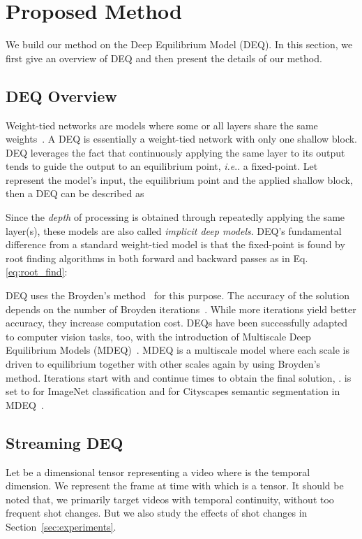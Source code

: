 \documentclass[runningheads]{llncs}
\makeatletter
\DeclareRobustCommand\onedot{\futurelet\@let@token\@onedot}
\def\@onedot{\ifx\@let@token.\else.\null\fi\xspace}
\def\ie{\emph{i.e}\onedot} \def\Ie{\emph{I.e}\onedot}
\makeatother
\begin{document}
\section{Proposed Method}\label{sec:method}


We build our method on the Deep Equilibrium Model (DEQ). In this section, we first give an overview of DEQ and then present the details of our method. 


\subsection{DEQ Overview}


Weight-tied networks are models where some or all layers share the same weights~\cite{bai2018trellis,dehghani2018universal}. A DEQ is essentially a weight-tied network with only one shallow block. DEQ leverages the fact that continuously applying the same layer to its output tends to guide the output to an equilibrium point, \ie a fixed-point. Let  represent the model’s input,  the equilibrium point and  the applied shallow block, then a DEQ can be described as

Since the {\em depth} of processing is obtained through repeatedly applying the same layer(s), these models are also called {\em implicit deep models}. DEQ’s fundamental difference from a standard weight-tied model is that the fixed-point is found by root finding algorithms in both forward and backward passes as in Eq. \ref{eq:root_find}: 

DEQ uses the Broyden's method~\cite{broyden1965class} for this purpose.  The accuracy of the solution depends on the number of Broyden iterations~\cite{bai2021neural,bai2021stabilizing}.  While more iterations yield better accuracy, they increase computation cost. 
DEQs have been successfully adapted to computer vision tasks, too, with the introduction of Multiscale Deep Equilibrium Models (MDEQ)~\cite{bai2020mdeq}. MDEQ is  a multiscale model where each scale is driven to equilibrium together with other scales again by using Broyden's method. Iterations start with  and continue  times to obtain the final solution, .  is set to  for ImageNet classification and  for Cityscapes semantic segmentation in MDEQ~\cite{bai2020mdeq}. 


\subsection{Streaming DEQ}


Let  be a  dimensional tensor representing a video where  is the temporal dimension. We represent the frame at time  with  which is a  tensor. It should be noted that, we primarily target videos with temporal continuity, without too frequent shot changes. But we also study the effects of shot changes in Section~\ref{sec:experiments}. 
\end{document}
